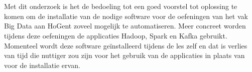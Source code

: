 \chapter{}%
\label{ch:stand-van-zaken}







Met dit onderzoek is het de bedoeling tot een goed voorstel tot oplossing te komen om de installatie van de nodige software voor de oefeningen van het vak Big Data aan HoGent zoveel mogelijk te automatiseren.
Meer concreet worden tijdens deze oefeningen de applicaties Hadoop, Spark en Kafka gebruikt. Momenteel wordt deze software geïnstalleerd tijdens de les zelf en dat is verlies van tijd die nuttiger zou zijn voor het gebruik van de applicaties in plaats van voor de installatie ervan. 

